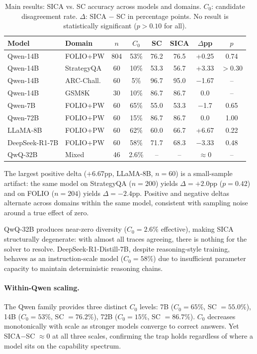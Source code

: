 \documentclass[11pt,a4paper]{article}
\begin{document}
\begin{table}[t]
\centering
\small
\caption{Main results: SICA vs. SC accuracy across models and domains. $C_0$: candidate disagreement rate. $\Delta$: SICA $-$ SC in percentage points. No result is statistically significant ($p > 0.10$ for all).}
\label{tab:main}
\begin{tabular}{llcccccc}
\toprule
\textbf{Model} & \textbf{Domain} & \textbf{$n$} & \textbf{$C_0$} & \textbf{SC} & \textbf{SICA} & \textbf{$\Delta$pp} & \textbf{$p$} \\
\midrule
Qwen-14B & FOLIO+PW & 804 & 53\% & 76.2 & 76.5 & +0.25 & 0.74 \\
Qwen-14B & StrategyQA & 60 & 10\% & 53.3 & 56.7 & +3.33 & $>$0.30 \\
Qwen-14B & ARC-Chall. & 60 & 5\% & 96.7 & 95.0 & $-$1.67 & -- \\
Qwen-14B & GSM8K & 30 & 10\% & 86.7 & 86.7 & 0.0 & -- \\
\midrule
Qwen-7B & FOLIO+PW & 60 & 65\% & 55.0 & 53.3 & $-$1.7 & 0.65 \\
Qwen-72B & FOLIO+PW & 60 & 15\% & 86.7 & 86.7 & 0.0 & 1.00 \\
\midrule
LLaMA-8B & FOLIO+PW & 60 & 62\% & 60.0 & 66.7 & +6.67 & 0.22 \\
DeepSeek-R1-7B & FOLIO+PW & 60 & 58\% & 71.7 & 68.3 & $-$3.33 & 0.48 \\
\midrule
QwQ-32B & Mixed & 46 & 2.6\% & -- & -- & $\approx$0 & -- \\
\bottomrule
\end{tabular}
\end{table}

The largest positive delta ($+6.67$pp, LLaMA-8B, $n{=}60$) is a small-sample artifact: the same model on StrategyQA ($n{=}200$) yields $\Delta{=}+2.0$pp ($p{=}0.42$) and on FOLIO ($n{=}204$) yields $\Delta{=}-2.4$pp. Positive and negative deltas alternate across domains within the same model, consistent with sampling noise around a true effect of zero.

QwQ-32B produces near-zero diversity ($C_0{=}2.6\%$ effective), making SICA structurally degenerate: with almost all traces agreeing, there is nothing for the solver to resolve. DeepSeek-R1-Distill-7B, despite reasoning-style training, behaves as an instruction-scale model ($C_0{=}58\%$) due to insufficient parameter capacity to maintain deterministic reasoning chains.

\paragraph{Within-Qwen scaling.} The Qwen family provides three distinct $C_0$ levels: 7B ($C_0{=}65\%$, SC $= 55.0\%$), 14B ($C_0{=}53\%$, SC $= 76.2\%$), 72B ($C_0{=}15\%$, SC $= 86.7\%$). $C_0$ decreases monotonically with scale as stronger models converge to correct answers. Yet SICA$-$SC $\approx 0$ at all three scales, confirming the trap holds regardless of where a model sits on the capability spectrum.
\end{document}
